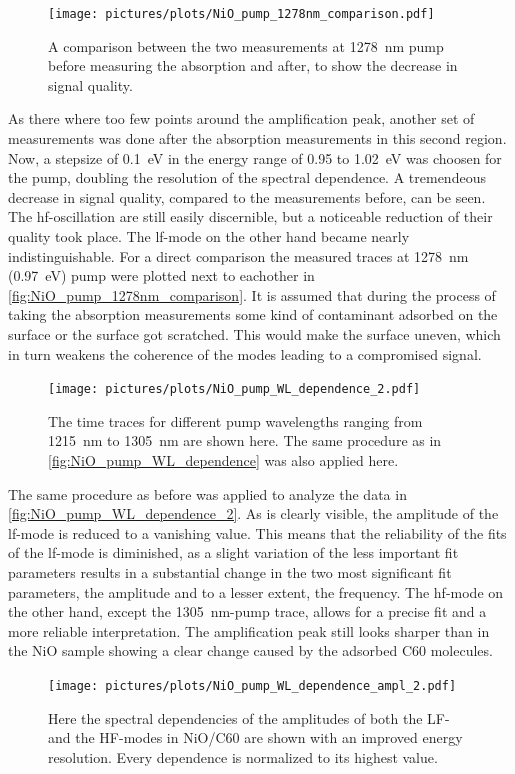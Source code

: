\begin{figure}[ht]
    \centering
    \texttt{[image: pictures/plots/NiO\_pump\_1278nm\_comparison.pdf]}
    \caption{A comparison between the two measurements at \qty{1278}{nm} pump before measuring the absorption and after, to show the decrease in signal quality.}
    \label{fig:NiO_pump_1278nm_comparison}
\end{figure}
As there where too few points around the amplification peak, another set of measurements was done after the absorption measurements in this second region.
Now, a stepsize of \qty{0.1}{eV} in the energy range of 0.95 to \qty{1.02}{eV} was choosen for the pump, doubling the resolution of the spectral dependence.
A tremendeous decrease in signal quality, compared to the measurements before, can be seen.
The hf-oscillation are still easily discernible, but a noticeable reduction of their quality took place.
The lf-mode on the other hand became nearly indistinguishable.
For a direct comparison the measured traces at \qty{1278}{nm} (\qty{0.97}{eV}) pump were plotted next to eachother in \autoref{fig:NiO_pump_1278nm_comparison}.
It is assumed that during the process of taking the absorption measurements some kind of contaminant adsorbed on the surface or the surface got scratched.
This would make the surface uneven, which in turn weakens the coherence of the modes leading to a compromised signal.
\begin{figure}[ht]
    \centering
    \texttt{[image: pictures/plots/NiO\_pump\_WL\_dependence\_2.pdf]}
    \caption{The time traces for different pump wavelengths ranging from \qty{1215}{nm} to \qty{1305}{nm} are shown here. The same procedure as in \autoref{fig:NiO_pump_WL_dependence} was also applied here.}
    \label{fig:NiO_pump_WL_dependence_2}
\end{figure}

The same procedure as before was applied to analyze the data in \autoref{fig:NiO_pump_WL_dependence_2}.
As is clearly visible, the amplitude of the lf-mode is reduced to a vanishing value.
This means that the reliability of the fits of the lf-mode is diminished, as a slight variation of the less important fit parameters results in a substantial change in the two most significant fit parameters, the amplitude and to a lesser extent, the frequency.
The hf-mode on the other hand, except the \qty{1305}{nm}-pump trace, allows for a precise fit and a more reliable interpretation.
The amplification peak still looks sharper than in the NiO sample showing a clear change caused by the adsorbed C60 molecules.
\begin{figure}[ht]
    \centering
    \texttt{[image: pictures/plots/NiO\_pump\_WL\_dependence\_ampl\_2.pdf]}
    \caption{Here the spectral dependencies of the amplitudes of both the LF- and the HF-modes in NiO/C60 are shown with an improved energy resolution. Every dependence is normalized to its highest value.}
    \label{fig:NiO_pump_WL_dependence_ampl_2}
\end{figure}
\FloatBarrier

